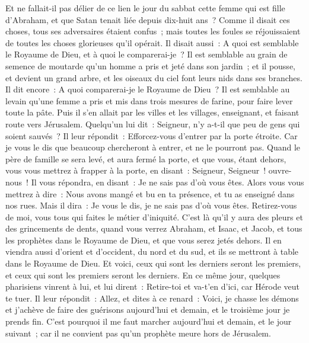 \begin{multicols}{2}
Et ne fallait-il pas délier de ce lien le jour du sabbat cette femme qui est fille d'Abraham, et que Satan tenait liée depuis dix-huit ans~?
Comme il disait ces choses, tous ses adversaires étaient confus~; mais toutes les foules se réjouissaient de toutes les choses glorieuses qu'il opérait.
Il disait aussi~: A quoi est semblable le Royaume de Dieu, et à quoi le comparerai-je~?
Il est semblable au grain de semence de moutarde qu'un homme a pris et jeté dans son jardin~; et il pousse, et devient un grand arbre, et les oiseaux du ciel font leurs nids dans ses branches.
Il dit encore~: A quoi comparerai-je le Royaume de Dieu~?
Il est semblable au levain qu'une femme a pris et mis dans trois mesures de farine, pour faire lever toute la pâte.
Puis il s'en allait par les villes et les villages, enseignant, et faisant route vers Jérusalem.
Quelqu'un lui dit~: Seigneur, n'y a-t-il que peu de gens qui soient sauvés~? Il leur répondit~:
Efforcez-vous d'entrer par la porte étroite. Car je vous le dis que beaucoup chercheront à entrer, et ne le pourront pas.
Quand le père de famille se sera levé, et aura fermé la porte, et que vous, étant dehors, vous vous mettrez à frapper à la porte, en disant~: Seigneur, Seigneur~! ouvre-nous~! Il vous répondra, en disant~: Je ne sais pas d'où vous êtes.
Alors vous vous mettrez à dire~: Nous avons mangé et bu en ta présence, et tu as enseigné dans nos rues.
Mais il dira~: Je vous le dis, je ne sais pas d'où vous êtes. Retirez-vous de moi, vous tous qui faites le métier d'iniquité.
C'est là qu'il y aura des pleurs et des grincements de dents, quand vous verrez Abraham, et Isaac, et Jacob, et tous les prophètes dans le Royaume de Dieu, et que vous serez jetés dehors.
Il en viendra aussi d'orient et d'occident, du nord et du sud, et ils se mettront à table dans le Royaume de Dieu.
Et voici, ceux qui sont les derniers seront les premiers, et ceux qui sont les premiers seront les derniers.
En ce même jour, quelques pharisiens vinrent à lui, et lui dirent~: Retire-toi et va-t'en d'ici, car Hérode veut te tuer.
Il leur répondit~: Allez, et dites à ce renard~: Voici, je chasse les démons et j'achève de faire des guérisons aujourd'hui et demain, et le troisième jour je prends fin.
C'est pourquoi il me faut marcher aujourd'hui et demain, et le jour suivant~; car il ne convient pas qu'un prophète meure hors de Jérusalem.

\end{multicols}
